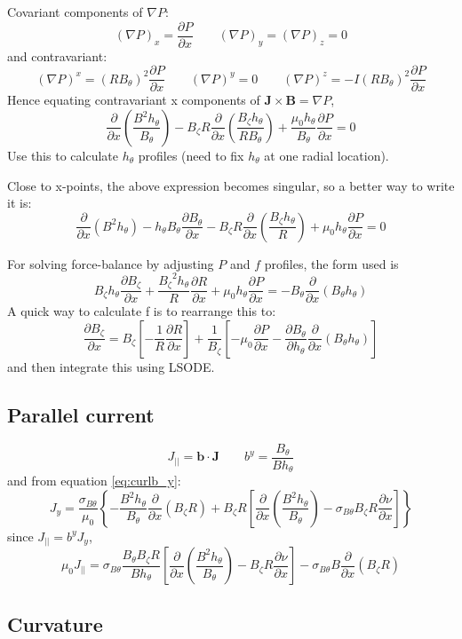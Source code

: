\documentclass[12pt]{article}
\newcommand{\sbt}{\ensuremath{\sigma_{B\theta}}}
\newcommand{\deriv}[2]{\ensuremath{\frac{\partial #1}{\partial #2}}}
\newcommand{\hthe}{\ensuremath{h_\theta}}
\newcommand{\Bp}{\ensuremath{B_\theta}}
\newcommand{\Bt}{\ensuremath{B_\zeta}}
\newcommand{\Vec}[1]{\ensuremath{\mathbf{#1}}}
\newcommand{\Bvec}{\Vec{B}}
\newcommand{\Jvec}{\Vec{J}}
\newcommand{\rbp}{\ensuremath{R\Bp}}
\newcommand{\rbpsq}{\ensuremath{\left(\rbp\right)^2}}
\begin{document}
Covariant components of $\nabla P$:
\[
\left(\nabla P\right)_x = \deriv{P}{x} \qquad \left(\nabla P\right)_y = \left(\nabla P\right)_z = 0
\]
and contravariant:
\[
\left(\nabla P\right)^x = \rbpsq\deriv{P}{x} \qquad \left(\nabla P\right)^y = 0 \qquad \left(\nabla P\right)^z = -I\rbpsq\deriv{P}{x}
\]
Hence equating contravariant x components of $\Jvec\times\Bvec = \nabla P$,
\begin{equation}
\deriv{}{x}\left(\frac{B^2\hthe}{\Bp}\right) - \Bt R\deriv{}{x}\left(\frac{\Bt\hthe}{R\Bp}\right) + \frac{\mu_0\hthe}{\Bp}\deriv{P}{x} = 0
\label{eq:xbalance}
\end{equation}
Use this to calculate $\hthe$ profiles (need to fix $\hthe$ at one radial location).

Close to x-points, the above expression becomes singular, so a better way to write it is:
\[
\deriv{}{x}\left(B^2\hthe\right) - \hthe\Bp\deriv{\Bp}{x} - \Bt R\deriv{}{x}\left(\frac{\Bt\hthe}{R}\right) + \mu_0\hthe\deriv{P}{x} = 0
\]

For solving force-balance by adjusting $P$ and $f$ profiles, the form used is
\[
\Bt\hthe\deriv{\Bt}{x} + \frac{\Bt^2\hthe}{R}\deriv{R}{x} + \mu_0\hthe\deriv{P}{x} = -\Bp\deriv{}{x}\left(\Bp\hthe\right)
\]
A quick way to calculate f is to rearrange this to:
\[
\deriv{\Bt}{x} = \Bt\left[-\frac{1}{R}\deriv{R}{x}\right] + \frac{1}{\Bt}\left[-\mu_0\deriv{P}{x} - \deriv{\Bp}{\hthe}\deriv{}{x}\left(\Bp\hthe\right)\right]
\]
and then integrate this using LSODE.


\subsection{Parallel current}

\[
J_{||} = \mathbf{b}\cdot\Jvec \qquad b^y = \frac{\Bp}{B\hthe}
\]
and from equation \ref{eq:curlb_y}:
\[
J_y = \frac{\sbt}{\mu_0}\left\{-\frac{B^2\hthe}{\Bp}\deriv{}{x}\left(\Bt R\right) + \Bt R\left[\deriv{}{x}\left(\frac{B^2\hthe}{\Bp}\right) - \sbt\Bt R\deriv{\nu}{x}\right]\right\}
\]
since $J_{||} = b^yJ_y$,
\[
\mu_0 J_{||} =\sbt\frac{\Bp\Bt R}{B\hthe}\left[\deriv{}{x}\left(\frac{B^2\hthe}{\Bp}\right) - \Bt R\deriv{\nu}{x}\right] - \sbt B\deriv{}{x}\left(\Bt R\right)
\]

\subsection{Curvature}
\end{document}
